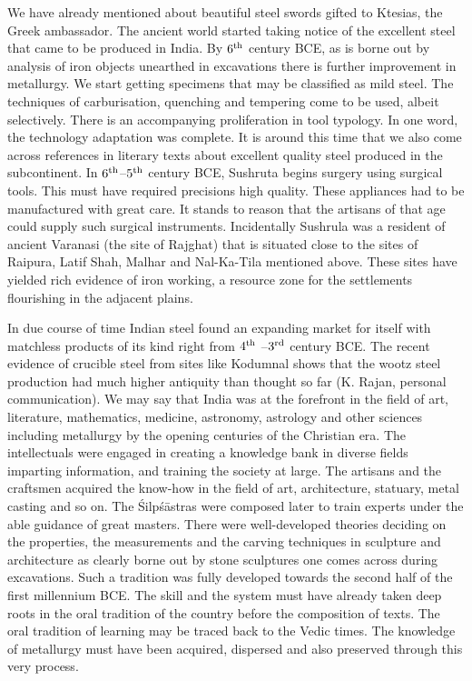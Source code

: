 We have already mentioned about beautiful steel swords gifted to Ktesias, the Greek ambassador. The ancient world started taking notice of the excellent steel that came to be produced in India. By $6^{\rm th}$ century BCE, as is borne out by analysis of iron objects unearthed in excavations there is further improvement in metallurgy. We start getting specimens that may be classified as mild steel. The techniques of carburisation, quenching and tempering come to be used, albeit selectively. There is an accompanying proliferation in tool typology. In one word, the technology adaptation was complete. It is around this time that we also come across references in literary texts about excellent quality steel produced in the subcontinent. In $6^{\rm th}$–$5^{\rm th}$ century BCE, Sushruta begins surgery using surgical tools. This must have required precisions high quality. These appliances had to be manufactured with great care. It stands to reason that the artisans of that age could supply such surgical instruments. Incidentally Sushrula was a resident of ancient Varanasi (the site of Rajghat) that is situated close to the sites of Raipura, Latif Shah, Malhar and Nal-Ka-Tila mentioned above. These sites have yielded rich evidence of iron working, a resource zone for the settlements flourishing in the adjacent plains.   	

In due course of time Indian steel found an expanding market for itself with matchless products of its kind right from $4^{\rm th}$ –$3^{\rm rd}$ century BCE. The recent evidence of crucible steel from sites like Kodumnal shows that the wootz steel production had much higher antiquity than thought so far (K. Rajan, personal communication). We may say that India was at the forefront in the field of art, literature, mathematics, medicine, astronomy, astrology and other sciences including metallurgy by the opening centuries of the Christian era. The intellectuals were engaged in creating a knowledge bank in diverse fields imparting information, and training the society at large. The artisans and the craftsmen acquired the know-how in the field of art, architecture, statuary, metal casting and so on. The Śilpśāstras were composed later to train experts under the able guidance of great masters. There were well-developed theories deciding on the properties, the measurements and the carving techniques in sculpture and architecture as clearly borne out by stone sculptures one comes across during excavations. Such a tradition was fully developed towards the second half of the first millennium BCE. The skill and the system must have already taken deep roots in the oral tradition of the country before the composition of texts. The oral tradition of learning may be traced back to the Vedic times. The knowledge of metallurgy must have been acquired, dispersed and also preserved through this very process. 

